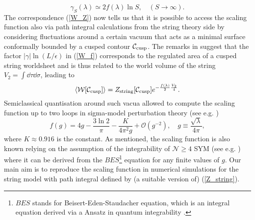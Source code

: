 %
%
\begin{equation}
\gamma_{S}(\lambda) \simeq 2 f(\lambda) \ln S,\quad  (S\to \infty).
\end{equation}
%
%
The correspondence (\ref{W_Z}) now tells us that it is possible to access the scaling function also via path integral calculations from the string theory side by considering fluctuations around a certain vacuum that acts as a minimal surface conformally bounded by a cusped contour $\mathcal{C}_{\rm cusp}$.  The remarks in \cite{Kruczenski:2002fb,Kruczenski:2007cy} suggest that the factor $\vert \gamma\vert \ln (L/\epsilon)$ in (\ref{W_f}) corresponds to the regulated area of a cusped string worldsheet and is thus related to the world volume of the string $V_{2}=\int \dd\tau \dd \sigma$, leading to 
%
%
\begin{equation}
\langle \mathcal{W}[\mathcal{C_{\rm cusp}}] \rangle =Z_{\rm string}[\mathcal{C_{\rm cusp}}] e^{-\frac{f(\lambda)}{2}\frac{V_{2}}{4}}.
\label{eq: W_exp_f}
\end{equation}
Semiclassical quantisation around such vacua allowed to compute the scaling function up to two loops in sigma-model perturbation theory (see e.g. \cite{Giombi:2009gd})
%
%
\begin{equation}
f(g) = 4g - \frac{3\ln 2}{\pi} - \frac{K}{4\pi^{2}g} + \mathcal{O}(g^{-2}), \quad g\equiv \frac{\sqrt{\lambda}}{4\pi},
\label{eq: scaling_fct}
\end{equation}
%
%
where $K\approx 0.916$ is the  constant. As mentioned, the scaling function is also known relying on the assumption of the integrability of $\mathcal{N}\geq 4$ SYM (see e.g. \cite{Beisert:2010jr}) where it can be derived from the $BES$\footnote{$BES$ stands for Beisert-Eden-Staudacher equation, which is an integral equation derived via a  Ansatz in quantum integrability \cite{Beisert:2006ez}.} equation for any finite values of $g$. Our main aim is to reproduce the scaling function in numerical simulations for the string model with path integral defined by (a suitable version of) (\ref{Z_string}). 
%
%
%
%
%
%
%
%
%
